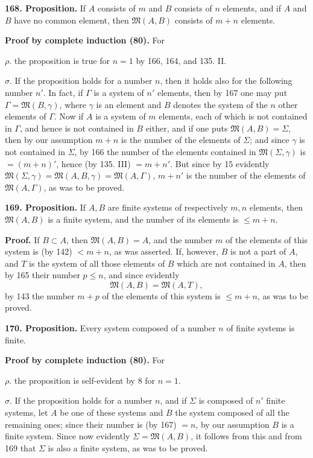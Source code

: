 \documentclass[11pt]{article}
\newcommand{\Mf}{\mathfrak{M}}
\newcommand{\partof}{\mathrel{\subset}}
\begin{document}
\noindent\textbf{168. Proposition.} If $A$ consists of $m$ and $B$ consists of $n$ elements, and if $A$ and $B$ have no common element, then $\Mf(A,B)$ consists of $m+n$ elements.

\noindent\textbf{Proof by complete induction (80).} For

\noindent $\rho.$ the proposition is true for $n=1$ by 166, 164, and 135. II.

\noindent $\sigma.$ If the proposition holds for a number $n$, then it holds also for the following number $n'$. In fact, if $\Gamma$ is a system of $n'$ elements, then by 167 one may put $\Gamma=\Mf(B,\gamma)$, where $\gamma$ is an element and $B$ denotes the system of the $n$ other elements of $\Gamma$. Now if $A$ is a system of $m$ elements, each of which is not contained in $\Gamma$, and hence is not contained in $B$ either, and if one puts $\Mf(A,B)=\Sigma$, then by our assumption $m+n$ is the number of the elements of $\Sigma$; and since $\gamma$ is not contained in $\Sigma$, by 166 the number of the elements contained in $\Mf(\Sigma,\gamma)$ is $=(m+n)'$, hence (by 135. III) $=m+n'$. But since by 15 evidently $\Mf(\Sigma,\gamma)=\Mf(A,B,\gamma)=\Mf(A,\Gamma)$, $m+n'$ is the number of the elements of $\Mf(A,\Gamma)$, as was to be proved.

\noindent\textbf{169. Proposition.} If $A,B$ are finite systems of respectively $m,n$ elements, then $\Mf(A,B)$ is a finite system, and the number of its elements is $\leq m+n$.

\noindent\textbf{Proof.} If $B\partof A$, then $\Mf(A,B)=A$, and the number $m$ of the elements of this system is (by 142) $<m+n$, as was asserted. If, however, $B$ is not a part of $A$, and $T$ is the system of all those elements of $B$ which are not contained in $A$, then by 165 their number $p\leq n$, and since evidently
\[
\Mf(A,B)=\Mf(A,T),
\]
by 143 the number $m+p$ of the elements of this system is $\leq m+n$, as was to be proved.

\noindent\textbf{170. Proposition.} Every system composed of a number $n$ of finite systems is finite.

\noindent\textbf{Proof by complete induction (80).} For

\noindent $\rho.$ the proposition is self-evident by 8 for $n=1$.

\noindent $\sigma.$ If the proposition holds for a number $n$, and if $\Sigma$ is composed of $n'$ finite systems, let $A$ be one of these systems and $B$ the system composed of all the remaining ones; since their number is (by 167) $=n$, by our assumption $B$ is a finite system. Since now evidently $\Sigma=\Mf(A,B)$, it follows from this and from 169 that $\Sigma$ is also a finite system, as was to be proved.
\end{document}
